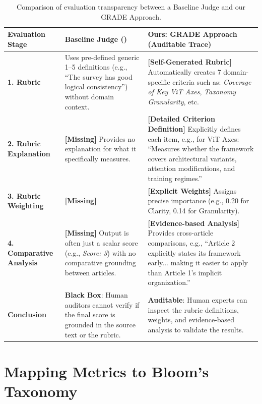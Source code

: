 \documentclass[11pt]{article}
\begin{document}
\begin{table}[htbp]
\centering
\caption{Comparison of evaluation transparency between a Baseline Judge and our GRADE Approach.}
\label{tab:auditability_comparison}
\small
\begin{tabularx}{\textwidth}{l|X|X}
\toprule
\textbf{Evaluation Stage} & \textbf{Baseline Judge (\cite{wang2024autosurvey})} & \textbf{Ours: GRADE Approach (Auditable Trace)} \\ \midrule
\textbf{1. Rubric} & Uses pre-defined generic 1--5 definitions (e.g., ``The survey has good logical consistency'') without domain context. & \textbf{[Self-Generated Rubric]} Automatically creates 7 domain-specific criteria such as: \textit{Coverage of Key ViT Axes}, \textit{Taxonomy Granularity}, etc. \\ \midrule
\textbf{2. Rubric Explanation} & \textbf{[Missing]} Provides no explanation for what it specifically measures. & \textbf{[Detailed Criterion Definition]} Explicitly defines each item, e.g., for ViT Axes: ``Measures whether the framework covers architectural variants, attention modifications, and training regimes.'' \\ \midrule
\textbf{3. Rubric Weighting} & \textbf{[Missing]}  & \textbf{[Explicit Weights]} Assigns precise importance (e.g., 0.20 for Clarity, 0.14 for Granularity). \\ \midrule
\textbf{4. Comparative Analysis} & \textbf{[Missing]} Output is often just a scalar score (e.g., \textit{Score: 3}) with no comparative grounding between articles. & \textbf{[Evidence-based Analysis]} Provides cross-article comparisons, e.g., ``Article 2 explicitly states its framework early... making it easier to apply than Article 1's implicit organization.'' \\ \midrule
\textbf{Conclusion} & \textbf{Black Box}: Human auditors cannot verify if the final score is grounded in the source text or the rubric. & \textbf{Auditable}: Human experts can inspect the rubric definitions, weights, and evidence-based analysis to validate the results. \\ \bottomrule
\end{tabularx}
\end{table}



\section{Mapping Metrics to Bloom's Taxonomy}
\label{sec:appendix_mapping}
\end{document}

